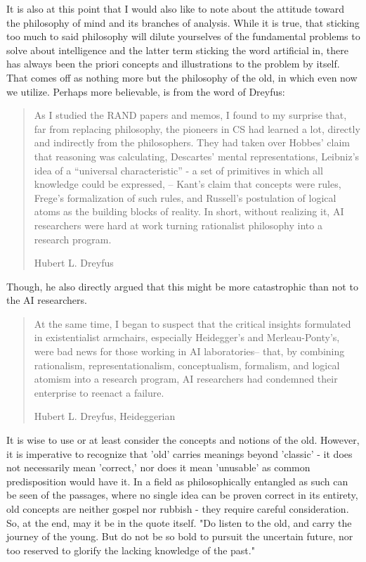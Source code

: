 It is also at this point that I would also like to note about the attitude toward the philosophy of mind and its branches of analysis. While it is true, that sticking too much to said philosophy will dilute yourselves of the fundamental problems to solve about intelligence and the latter term sticking the word artificial in, there has always been the priori concepts and illustrations to the problem by itself. That comes off as nothing more but the philosophy of the old, in which even now we utilize. Perhaps more believable, is from the word of Dreyfus: 
\blockquote[Hubert L. Dreyfus]{As I studied the RAND papers and memos, I found to my surprise that, far from replacing philosophy, the pioneers in CS had learned a lot, directly and indirectly from the philosophers. They had taken over Hobbes' claim that reasoning was calculating, Descartes' mental representations, Leibniz's idea of a “universal characteristic” - a set of primitives in which all knowledge could be expressed, -- Kant's claim that concepts were rules, Frege's formalization of such rules, and Russell's postulation of logical atoms as the building blocks of reality. In short, without realizing it, AI researchers were hard at work turning rationalist philosophy into a research program.}

Though, he also directly argued that this might be more catastrophic than not to the AI researchers. 
\blockquote[Hubert L. Dreyfus, Heideggerian]{At the same time, I began to suspect that the critical insights formulated in existentialist armchairs, especially Heidegger's and Merleau-Ponty's, were bad news for those working in AI laboratories-- that, by combining rationalism, representationalism, conceptualism, formalism, and logical atomism into a research program, AI researchers had condemned their enterprise to reenact a failure.}

It is wise to use or at least consider the concepts and notions of the old. However, it is imperative to recognize that 'old' carries meanings beyond 'classic' - it does not necessarily mean 'correct,' nor does it mean 'unusable' as common predisposition would have it. In a field as philosophically entangled as such can be seen of the passages, where no single idea can be proven correct in its entirety, old concepts are neither gospel nor rubbish - they require careful consideration. So, at the end, may it be in the quote itself. "Do listen to the old, and carry the journey of the young. But do not be so bold to pursuit the uncertain future, nor too reserved to glorify the lacking knowledge of the past."

